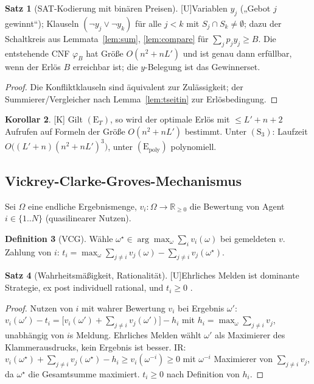 \documentclass[a4paper,12pt]{article}
\theoremstyle{definition}
\newtheorem{definition}{Definition}[section]
\newtheorem{satz}[definition]{Satz}
\newtheorem{korollar}[definition]{Korollar}
\newcommand{\tU}{\textsf{\small[U]}}   %
\newcommand{\tK}{\textsf{\small[K]}}   %
\newcommand{\RR}{\mathbb{R}}
\newcommand{\Epoly}{(\mathrm{E}_{\mathrm{poly}})}
\newcommand{\ET}{(\mathrm{E}_{T})}
\newcommand{\Sdrei}{(\mathrm{S}_{3})}
\begin{document}
\begin{satz}[SAT-Kodierung mit binären Preisen]\tU\label{satz:wdp-sat}
Variablen \(y_j\) („Gebot \(j\) gewinnt“); Klauseln \((\neg y_j\vee\neg y_k)\) für alle \(j<k\) mit \(S_j\cap S_k\ne\emptyset\); dazu der Schaltkreis aus Lemmata~\ref{lem:sum}, \ref{lem:compare} für \(\sum_jp_jy_j\ge B\). Die entstehende CNF \(\varphi_{B}\) hat Größe \(O(n^2+nL')\) und ist genau dann erfüllbar, wenn der Erlös \(B\) erreichbar ist; die \(y\)-Belegung ist das Gewinnerset.
\end{satz}
\begin{proof}
Die Konfliktklauseln sind äquivalent zur Zulässigkeit; der Summierer/Vergleicher nach Lemma~\ref{lem:tseitin} zur Erlösbedingung.
\end{proof}
\begin{korollar}\tK
Gilt \(\ET\), so wird der optimale Erlös mit \(\le L'+n+2\) Aufrufen auf Formeln der Größe \(O(n^2+nL')\) bestimmt. Unter \(\Sdrei\): Laufzeit \(O\big((L'+n)(n^2+nL')^3\big)\), unter \(\Epoly\) polynomiell.
\end{korollar}

\subsection{Vickrey-Clarke-Groves-Mechanismus}
Sei \(\Omega\) eine endliche Ergebnismenge, \(v_i:\Omega\to\RR_{\ge0}\) die Bewertung von Agent \(i\in\{1..N\}\) (quasilinearer Nutzen).

\begin{definition}[VCG]
Wähle \(\omega^\star\in\arg\max_\omega\sum_iv_i(\omega)\) bei gemeldeten \(v\). Zahlung von \(i\): \(t_i=\max_\omega\sum_{j\ne i}v_j(\omega)-\sum_{j\ne i}v_j(\omega^\star)\).
\end{definition}

\begin{satz}[Wahrheitsmäßigkeit, Rationalität]\tU\label{satz:vcg}
Ehrliches Melden ist dominante Strategie, ex post individuell rational, und \(t_i\ge0\) \cite{vickrey1961,clarke1971,groves1973}.
\end{satz}
\begin{proof}
Nutzen von \(i\) mit wahrer Bewertung \(v_i\) bei Ergebnis \(\omega'\): \(v_i(\omega')-t_i=\big[v_i(\omega')+\sum_{j\ne i}v_j(\omega')\big]-h_i\) mit \(h_i=\max_\omega\sum_{j\ne i}v_j\), unabhängig von \(i\)s Meldung. Ehrliches Melden wählt \(\omega'\) als Maximierer des Klammerausdrucks, kein Ergebnis ist besser. IR: \(v_i(\omega^\star)+\sum_{j\ne i}v_j(\omega^\star)-h_i\ge v_i(\omega^{-i})\ge0\) mit \(\omega^{-i}\) Maximierer von \(\sum_{j\ne i}v_j\), da \(\omega^\star\) die Gesamtsumme maximiert. \(t_i\ge0\) nach Definition von \(h_i\).
\end{proof}
\end{document}
